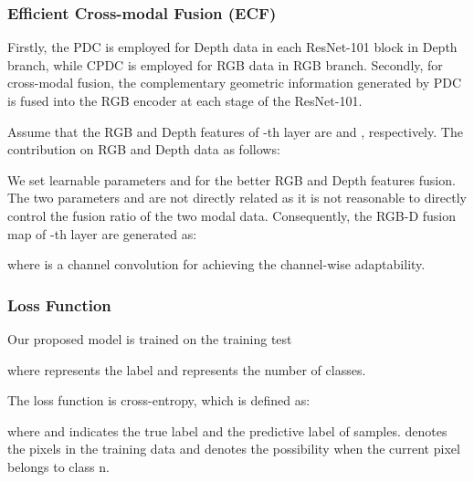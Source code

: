 \documentclass[lettersize,journal]{IEEEtran}
\begin{document}
\subsubsection{Efficient Cross-modal Fusion (ECF)}
Firstly, the PDC is employed for Depth data in each ResNet-101 block in Depth branch, while CPDC is employed for RGB data in RGB branch. \iffalse Thirdly, the outputs of the two modules are convolved to keep the same channel as the original features.\fi Secondly, for cross-modal fusion, the complementary geometric information generated by PDC is fused into the RGB encoder at each stage of the ResNet-101. 

Assume that the RGB and Depth features of -th layer are  and , respectively. 
The contribution on RGB and
Depth data as follows:



We set learnable parameters  and  for the better RGB and Depth features fusion. The two parameters   and  are not directly related as it is not reasonable to directly control the fusion ratio of the two modal data. Consequently, the RGB-D fusion map of -th layer are generated as:

where  is a channel convolution for achieving the channel-wise adaptability.

\subsubsection{Loss Function}
Our proposed model is trained on the training test 

where  represents the label and  represents the number of classes.

The loss function is cross-entropy, which is defined as:


where  and  indicates the true label and the predictive label of samples. 
 denotes the pixels in the training data and  denotes the possibility when the current pixel belongs to class n. 

\iffalse It should be noted that both DDCA and ELKA-DDCA can be easily integrated into two branches according to Eq.(\ref{contribution}). \fi
\end{document}
